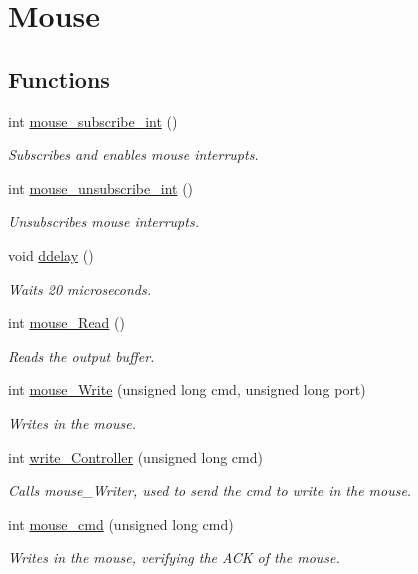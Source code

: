 \hypertarget{group___mouse}{}\section{Mouse}
\label{group___mouse}
\subsection*{Functions}
\begin{DoxyCompactItemize}
\item 
int \hyperlink{group___mouse_ga99506573209b197b84ee22a228b89fbd}{mouse\+\_\+subscribe\+\_\+int} ()
\begin{DoxyCompactList}\small\item\em Subscribes and enables mouse interrupts. \end{DoxyCompactList}\item 
int \hyperlink{group___mouse_ga685ad2706aca36d9869a30a19b9f446a}{mouse\+\_\+unsubscribe\+\_\+int} ()
\begin{DoxyCompactList}\small\item\em Unsubscribes mouse interrupts. \end{DoxyCompactList}\item 
void \hyperlink{group___mouse_ga4fb4a7f0f7a9ea26af0c1184b53f4bf3}{ddelay} ()
\begin{DoxyCompactList}\small\item\em Waits 20 microseconds. \end{DoxyCompactList}\item 
int \hyperlink{group___mouse_gaad10b68ed5addb9bd150288dd869d586}{mouse\+\_\+\+Read} ()
\begin{DoxyCompactList}\small\item\em Reads the output buffer. \end{DoxyCompactList}\item 
int \hyperlink{group___mouse_gae7c331cf6f4c63d80b6bce11c2c8e771}{mouse\+\_\+\+Write} (unsigned long cmd, unsigned long port)
\begin{DoxyCompactList}\small\item\em Writes in the mouse. \end{DoxyCompactList}\item 
int \hyperlink{group___mouse_ga4f52e05e730b3482a7b249d818b816b1}{write\+\_\+\+Controller} (unsigned long cmd)
\begin{DoxyCompactList}\small\item\em Calls mouse\+\_\+\+Writer, used to send the cmd to write in the mouse. \end{DoxyCompactList}\item 
int \hyperlink{group___mouse_gad7c890a972e1f92e3a494d356795a103}{mouse\+\_\+cmd} (unsigned long cmd)
\begin{DoxyCompactList}\small\item\em Writes in the mouse, verifying the A\+CK of the mouse. \end{DoxyCompactList}\end{DoxyCompactItemize}


